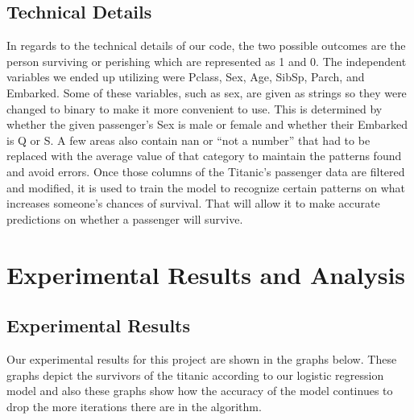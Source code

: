 \documentclass{IEEE}
\begin{document}
\subsection{Technical Details}
In regards to the technical details of our code, the two possible outcomes are the person surviving or perishing which are represented as 1 and 0. The independent variables we ended up utilizing were Pclass, Sex, Age, SibSp, Parch, and Embarked. Some of these variables, such as sex, are given as strings so they were changed to binary to make it more convenient to use. This is determined by whether the given passenger’s Sex is male or female and whether their Embarked is Q or S. A few areas also contain nan or “not a number” that had to be replaced with the average value of that category to maintain the patterns found and avoid errors. Once those columns of the Titanic’s passenger data are filtered and modified, it is used to train the model to recognize certain patterns on what increases someone’s chances of survival. That will allow it to make accurate predictions on whether a passenger will survive.

\section{Experimental Results and Analysis}

\subsection{Experimental Results}
Our experimental results for this project are shown in the graphs below. These graphs depict the survivors of the titanic according to our logistic regression model and also these graphs show how the accuracy of the model continues to drop the more iterations there are in the algorithm.
\end{document}
